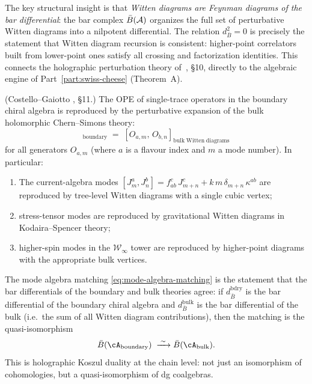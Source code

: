 \begin{remark}
The key structural insight is that \emph{Witten diagrams are Feynman
diagrams of the bar differential}: the bar complex $\bar{B}(\mathcal A)$ organizes
the full set of perturbative Witten diagrams into a nilpotent
differential. The relation $d_{\bar{B}}^2 = 0$ is precisely the
statement that Witten diagram recursion is consistent: higher-point
correlators built from lower-point ones satisfy all crossing and
factorization identities. This connects the holographic perturbation
theory of~\cite{CG18}, \S10, directly to the algebraic engine of
Part~\ref{part:swiss-cheese} (Theorem~A).
\end{remark}

\begin{proposition}
\textup{(Costello--Gaiotto \cite{CG18}, \S11.)}
The OPE of single-trace operators in the boundary chiral algebra is
reproduced by the perturbative expansion of the bulk holomorphic
Chern--Simons theory:
\begin{equation}%
 [O_{a,m},\, O_{b,n}]_{\mathrm{boundary}}
 \;=\;
 [O_{a,m},\, O_{b,n}]_{\mathrm{bulk\;Witten\;diagrams}}
\end{equation}
for all generators $O_{a,m}$ (where $a$ is a flavour index and $m$ a
mode number). In particular:
\begin{enumerate}[label=\textup{(\roman*)},nosep]
\item The current-algebra modes $[J^a_m, J^b_n] = f^{c}_{ab}\,J^c_{m+n}
 + k\,m\,\delta_{m+n}\,\kappa^{ab}$ are reproduced by
 tree-level Witten diagrams with a single cubic vertex;
\item stress-tensor modes are reproduced by gravitational Witten
 diagrams in Kodaira--Spencer theory;
\item higher-spin modes in the $\mathcal{W}_\infty$ tower are
 reproduced by higher-point diagrams with the appropriate bulk
 vertices.
\end{enumerate}
\end{proposition}

\begin{remark}
The mode algebra matching \eqref{eq:mode-algebra-matching} is the
statement that the bar differentials of the boundary and bulk theories
agree: if $d_{\bar{B}}^{\mathrm{bdry}}$ is the bar differential of the
boundary chiral algebra and $d_{\bar{B}}^{\mathrm{bulk}}$ is the bar
differential of the bulk (i.e.\ the sum of all Witten diagram
contributions), then the matching is the quasi-isomorphism
\[
 \bar{B}(\cA_{\mathrm{boundary}})
 \;\xrightarrow{\;\sim\;}
 \bar{B}(\cA_{\mathrm{bulk}}).
\]
This is holographic Koszul duality at the chain level: not just an
isomorphism of cohomologies, but a quasi-isomorphism of dg coalgebras.
\end{remark}

